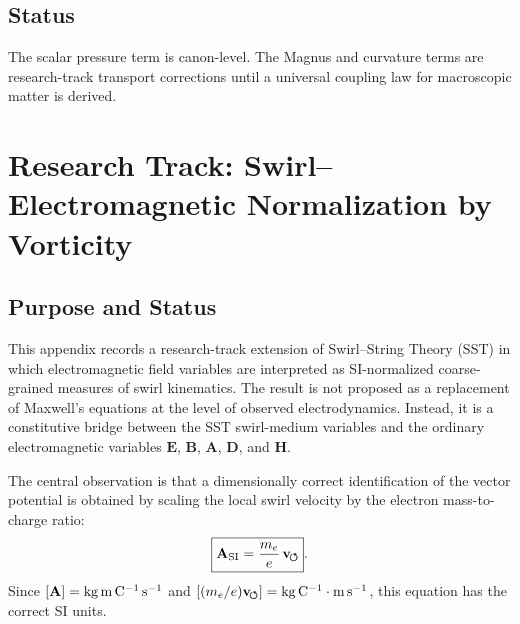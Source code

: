 \subsection{Status}
    The scalar pressure term is canon-level. The Magnus and curvature terms are
    research-track transport corrections until a universal coupling law for
    macroscopic matter is derived.
    
    

\section{Research Track: Swirl--Electromagnetic Normalization by Vorticity}
\label{app:research_swirl_em_vorticity}

\providecommand{\swirlarrow}{\boldsymbol{\circlearrowleft}}
\providecommand{\vswirl}{\mathbf{v}_{\!\boldsymbol{\circlearrowleft}}}
\providecommand{\vnorm}{\lVert\mathbf{v}_{\!\boldsymbol{\circlearrowleft}}\rVert}
\providecommand{\rhoF}{\rho_{\!f}}
\providecommand{\rhoE}{\rho_{\!E}}
\providecommand{\rhoM}{\rho_{\!m}}
\providecommand{\rc}{r_c}
\providecommand{\Fmax}{F_{\max}^{\rm swirl}}

\subsection{Purpose and Status}
    
    This appendix records a research-track extension of Swirl--String Theory
    (SST) in which electromagnetic field variables are interpreted as
    SI-normalized coarse-grained measures of swirl kinematics.  The result is
    not proposed as a replacement of Maxwell's equations at the level of
    observed electrodynamics.  Instead, it is a constitutive bridge between
    the SST swirl-medium variables and the ordinary electromagnetic variables
    \(\mathbf{E}\), \(\mathbf{B}\), \(\mathbf{A}\), \(\mathbf{D}\), and
    \(\mathbf{H}\).
    
    The central observation is that a dimensionally correct identification of
    the vector potential is obtained by scaling the local swirl velocity by the
    electron mass-to-charge ratio:
    \begin{equation}
        \boxed{
            \mathbf{A}_{\rm SI}
            =
            \frac{m_e}{e}\,
            \vswirl
        } .
        \label{eq:swirl_vector_potential_bridge}
    \end{equation}
    Since \([\mathbf{A}]={\rm kg\,m\,C^{-1}\,s^{-1}}\) and
    \([(m_e/e)\vswirl]={\rm kg\,C^{-1}}\cdot{\rm m\,s^{-1}}\), this equation
    has the correct SI units.
    
